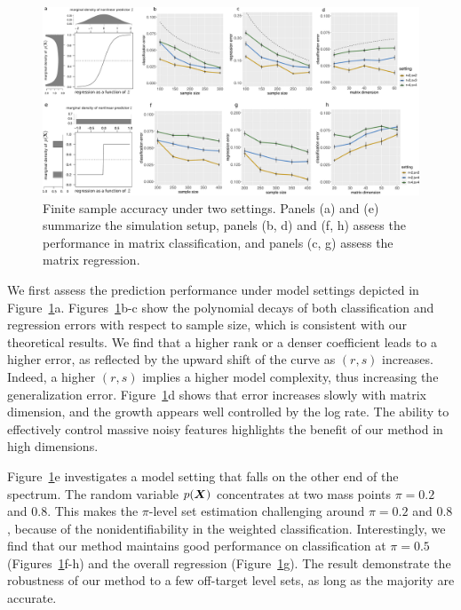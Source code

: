 \documentclass[11pt]{article}
\theoremstyle{definition}
\begin{document}
\begin{figure}[H]
\centering
\includegraphics[width=1\textwidth]{combined.pdf}
\caption{Finite sample accuracy under two settings. Panels (a) and (e) summarize the simulation setup, panels (b, d) and (f, h) assess the performance in matrix classification, and panels (c, g) assess the matrix regression. }\label{fig:logistic}
\vspace{-.8cm}
\end{figure}

We first assess the prediction performance under model settings depicted in Figure~\ref{fig:logistic}a. 
Figures~\ref{fig:logistic}b-c show the polynomial decays of both classification and regression errors with respect to sample size, which is consistent with our theoretical results. We find that a higher rank or a denser coefficient leads to a higher error, as reflected by the upward shift of the curve as $(r,s)$ increases. Indeed, a higher $(r,s)$ implies a higher model complexity, thus increasing the generalization error. Figure~\ref{fig:logistic}d shows that error increases slowly with matrix dimension, and the growth appears well controlled by the log rate. The ability to effectively control massive noisy features highlights the benefit of our method in high dimensions. 

Figure~\ref{fig:logistic}e investigates a model setting that falls on the other end of the spectrum. The random variable $p(\bm X)$ concentrates at two mass points $\pi=0.2$ and $0.8$. This makes the $\pi$-level set estimation challenging around $\pi=0.2$ and $0.8$, because of the nonidentifiability in the weighted classification. Interestingly, we find that our method maintains good performance on classification at $\pi=0.5$ (Figures~\ref{fig:logistic}f-h) and the overall regression (Figure~\ref{fig:logistic}g). The result demonstrate the robustness of our method to a few off-target level sets, as long as the majority are accurate.
\end{document}
